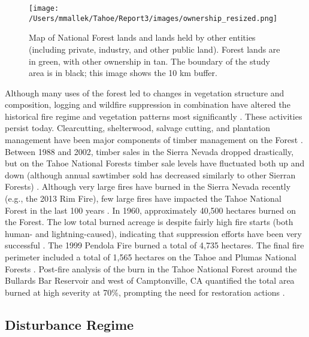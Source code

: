 \begin{figure}[!htbp]
\centering
\texttt{[image: /Users/mmallek/Tahoe/Report3/images/ownership\_resized.png]}
\caption{Map of National Forest lands and lands held by other entities (including private, industry, and other public land). Forest lands are in green, with other ownership in tan. The boundary of the study area is in black; this image shows the 10 km buffer.} 
\label{ownership}
\end{figure}

Although many uses of the forest led to changes in vegetation structure and composition, logging and wildfire suppression in combination have altered the historical fire regime and vegetation patterns most significantly \citep{Storer1963,Stephens2015,Knapp2013,Hessburg2005}. These activities persist today. Clearcutting, shelterwood, salvage cutting, and plantation management have been major components of timber management on the Forest \citep{USDAForestService2014}. Between 1988 and 2002, timber sales in the Sierra Nevada dropped drastically, but on the Tahoe National Forests timber sale levels have fluctuated both up and down (although annual sawtimber sold has decreased similarly to other Sierran Forests) \citep{USDAForestService2004}. Although very large fires have burned in the Sierra Nevada recently (e.g., the 2013 Rim Fire), few large fires have impacted the Tahoe National Forest in the last 100 years \citep{USDAForestService1990}. In 1960, approximately 40,500 hectares burned on the Forest. The low total burned acreage is despite fairly high fire starts (both human- and lightning-caused), indicating that suppression efforts have been very successful \citep{USDAForestService1990}. The 1999 Pendola Fire burned a total of 4,735 hectares. The final fire perimeter included a total of 1,565 hectares on the Tahoe and Plumas National Forests \citep{Shaw2009,USDOJ2009}. Post-fire analysis of the burn in the Tahoe National Forest around the Bullards Bar Reservoir and west of Camptonville, CA quantified the total area burned at high severity at 70\%, prompting the need for restoration actions \citep{USDAForestService1999}. 






\subsection{Disturbance Regime}
